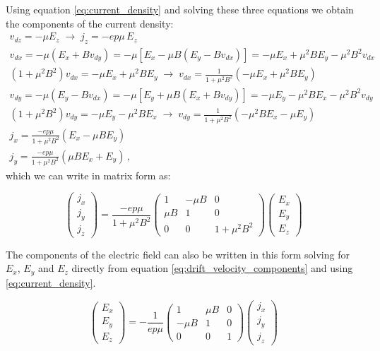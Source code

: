 \documentclass[11pt,a4paper]{article}
\begin{document}
Using equation \eqref{eq:current_density} and solving these three equations we obtain the components of the current density:
\begin{gather*}
v_{dz} = -\mu E_z\;\rightarrow\; j_z=-ep\mu\,E_z\\
v_{dx} = -\mu\left(E_x + B v_{dy}\right)=-\mu\left[E_x-\mu B\left(E_y-Bv_{dx}\right)\right]=-\mu E_x+\mu^2BE_y-\mu^2B^2v_{dx}\\
\left(1+\mu^2B^2\right)v_{dx}=-\mu E_x+\mu^2BE_y\;\rightarrow\;v_{dx}=\frac{1}{1+\mu^2B^2}\left(-\mu E_x+\mu^2BE_y\right)\\
v_{dy} = -\mu\left(E_y - B v_{dx}\right)=-\mu\left[E_y + \mu B\left(E_x + Bv_{dy}\right)\right]=-\mu E_y - \mu^2BE_x - \mu^2B^2v_{dy}\\
\left(1+\mu^2B^2\right)v_{dy}=-\mu E_y-\mu^2BE_x\;\rightarrow\;v_{dy}=\frac{1}{1+\mu^2B^2}\left(-\mu^2B E_x - \mu E_y\right)\\
j_x=\frac{-ep\mu}{1+\mu^2B^2}\left(E_x - \mu BE_y\right)\\
j_y=\frac{-ep\mu}{1+\mu^2B^2}\left(\mu BE_x+E_y\right)\,,
\end{gather*}
which we can write in matrix form as:

\begin{equation}\label{eq:current_density_components}
\begin{pmatrix}
j_x \\ j_y \\ j_z
\end{pmatrix}=
\frac{-ep\mu}{1+\mu^2B^2}
\begin{pmatrix}
1 & -\mu B & 0 \\
\mu B & 1 & 0 \\
0 & 0 & 1+\mu^2B^2
\end{pmatrix}
\begin{pmatrix}
E_x \\ E_y \\ E_z
\end{pmatrix}
\end{equation}

The components of the electric field can also be written in this form solving for $E_x$, $E_y$ and $E_z$ directly from equation \eqref{eq:drift_velocity_components} and using \eqref{eq:current_density}.

\begin{equation}\label{eq:electric_field}
\begin{pmatrix}
E_x \\ E_y \\ E_z
\end{pmatrix}=
-\frac{1}{ep\mu}
\begin{pmatrix}
1 & \mu B & 0 \\
-\mu B & 1 & 0 \\
0 & 0 & 1
\end{pmatrix}
\begin{pmatrix}
j_x \\ j_y \\ j_z
\end{pmatrix}
\end{equation}
\end{document}

